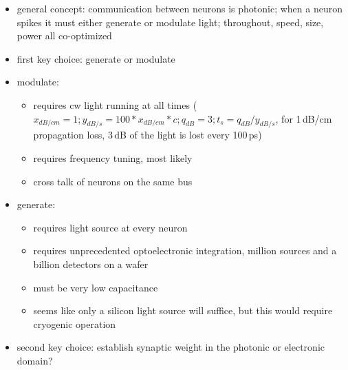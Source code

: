 \documentclass[twocolumn]{article}
\begin{document}
\begin{itemize}

\item general concept: communication between neurons is photonic; when a neuron spikes it must either generate or modulate light; throughout, speed, size, power all co-optimized

\item first key choice: generate or modulate

\item modulate:
\begin{itemize}
\item requires cw light running at all times ($x_{dB/cm} = 1; y_{dB/s} = 100*x_{dB/cm}*c; q_{dB} = 3; t_s = q_{dB}/y_{dB/s}$, for 1\,dB/cm propagation loss, 3\,dB of the light is lost every 100\,ps)
\item requires frequency tuning, most likely
\item cross talk of neurons on the same bus
\end{itemize}

\item generate:
\begin{itemize}
\item requires light source at every neuron
\item requires unprecedented optoelectronic integration, million sources and a billion detectors on a wafer
\item must be very low capacitance
\item seems like only a silicon light source will suffice, but this would require cryogenic operation
\end{itemize}

\item second key choice: establish synaptic weight in the photonic or electronic domain?


\end{itemize}
\end{document}
